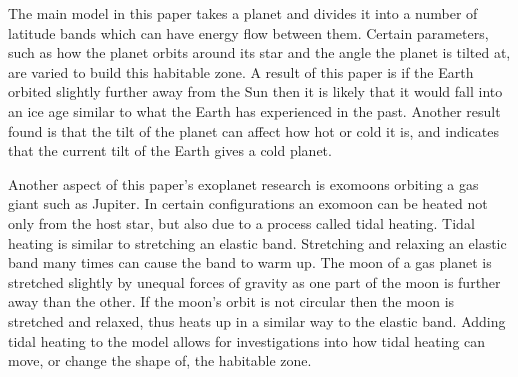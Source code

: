 \documentclass[12pt, onecolumn]{revtex4-2}    %
\begin{document}
The main model in this paper takes a planet and divides it into a number of latitude bands which can have energy flow between them.
Certain parameters, such as how the planet orbits around its star and the angle the planet is tilted at, are varied to build this habitable zone.
A result of this paper is if the Earth orbited slightly further away from the Sun then it is likely that it would fall into an ice age similar to what the Earth has experienced in the past.
Another result found is that the tilt of the planet can affect how hot or cold it is, and indicates that the current tilt of the Earth gives a cold planet.

Another aspect of this paper's exoplanet research is exomoons orbiting a gas giant such as Jupiter.
In certain configurations an exomoon can be heated not only from the host star, but also due to a process called tidal heating.
Tidal heating is similar to stretching an elastic band.
Stretching and relaxing an elastic band many times can cause the band to warm up.
The moon of a gas planet is stretched slightly by unequal forces of gravity as one part of the moon is further away than the other.
If the moon's orbit is not circular then the moon is stretched and relaxed, thus heats up in a similar way to the elastic band.
Adding tidal heating to the model allows for investigations into how tidal heating can move, or change the shape of, the habitable zone.
\end{document}
